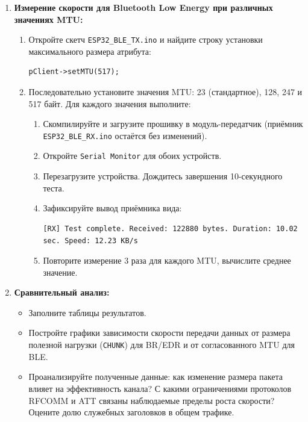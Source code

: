 \begin{enumerate}[nosep, leftmargin=*]
    \item \textbf{Измерение скорости для Bluetooth Low Energy при различных значениях MTU:}
    \begin{enumerate}[label=\alph*), nosep]
        \item Откройте скетч \texttt{ESP32\_BLE\_TX.ino} и найдите строку установки максимального размера атрибута:
        \begin{lstlisting}
pClient->setMTU(517);
        \end{lstlisting}
        \item Последовательно установите значения MTU: 23 (стандартное), 128, 247 и 517 байт. Для каждого значения выполните:
        \begin{enumerate}[label=\roman*), nosep]
            \item Скомпилируйте и загрузите прошивку в модуль-передатчик (приёмник \texttt{ESP32\_BLE\_RX.ino} остаётся без изменений).
            \item Откройте \texttt{Serial Monitor} для обоих устройств.
            \item Перезагрузите устройства. Дождитесь завершения 10-секундного теста.
            \item Зафиксируйте вывод приёмника вида:
            \begin{lstlisting}
[RX] Test complete. Received: 122880 bytes. Duration: 10.02 sec. Speed: 12.23 KB/s
            \end{lstlisting}
            \item Повторите измерение 3 раза для каждого MTU, вычислите среднее значение.
        \end{enumerate}
    \end{enumerate}

    \item \textbf{Сравнительный анализ:}
    \begin{itemize}[nosep]
        \item Заполните таблицы результатов.
        \item Постройте графики зависимости скорости передачи данных от размера полезной нагрузки (\texttt{CHUNK}) для BR/EDR и от согласованного MTU для BLE.
        \item Проанализируйте полученные данные: как изменение размера пакета влияет на эффективность канала? С какими ограничениями протоколов RFCOMM и ATT связаны наблюдаемые пределы роста скорости? Оцените долю служебных заголовков в общем трафике.
    \end{itemize}
\end{enumerate}


